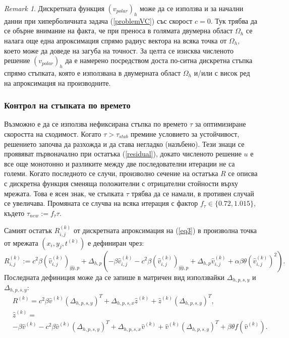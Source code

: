 \documentclass[a4paper]{article}
\newcommand{\rf}[1]{(\ref{#1})}
\theoremstyle{remark}
\newtheorem*{remark}{Remark}
\begin{document}
\begin{remark}
Дискретната функция $(v_{polar})_h$ може да се използва и за начални данни при хиперболичната задача \rf{problemVC} със скорост $c=0$. Тук трябва да се обърне внимание на факта, че при преноса в голямата двумерна област $\Omega_h$ се налага още една апроксимация спрямо радиус вектора на всяка точка от $\Omega_h$, което може да доведе на загуба на точност. За целта се изисква численото решение $(v_{polar})_h$ да е намерено посредством доста по-ситна дискретна стъпка спрямо стъпката, която е използвана в двумерната област $\Omega_h$ и/или с висок ред на апроксимация на производните.
\end{remark}

\subsubsection{Контрол на стъпката по времето}
Възможно е да се използва нефиксирана стъпка по времето $\tau$ за оптимизиране скоростта на сходимост. Когато $\tau > \tau_{stab}$ премине условието за устойчивост, решението започва да разхожда и да става негладко (назъбено). Тези знаци се проявяват първоначално при остатъка \rf{residual}, докато численото решение $u$ е все още монотонно и разликите между две последователни итерации не са големи. Когато последното се случи, произволно сечение на остатъка $R$ се описва с дискретна функция сменяща положителни с отрицателни стойности върху мрежата. Това е ясен знак, че стъпката $\tau$ трябва да се намали, в противен случай се увеличава. Промяната се случва на всяка итерация с фактор $f_{\tau} \in \{0.72, 1.015\}$, където $\tau_{new} := f_{\tau}\tau$.

Самият остатък $R^{(k)}_{i,j}$ от дискретната апроксимация на \rf{eq3} в произволна точка от мрежата $(x_i,y_j,t^{(k)})$ е дефиниран чрез:
\begin{equation}\label{residual}
R_{i,j}^{(k)} := 
c^2\beta (\widehat{v}^{(k)}_{i,j})_{\widehat{yy},p} + \Delta_{h,p}(-\beta \widehat{v}^{(k)}_{i,j} - c^2\beta (\widehat{v}^{(k)}_{i,j})_{\widehat{yy},p} + \Delta_{h,p} \widehat{v}^{(k)}_{i,j} 
+ \alpha \beta \theta (\widehat{v}^{(k)}_{i,j})^2  ).
\end{equation}
Последната дефиниция може да се запише в матричен вид използвайки $\Delta_{h,p,s,y}$ и $\Delta_{h,p,s,y}$:
\begin{align}\label{residualM}
&R^{(k)} = 
c^2\beta \widehat{v}^{(k)}(\Delta_{h,p,s,y})^T + \Delta_{h,p,s,x}  \widehat{z}^{(k)} + \widehat{z}^{(k)}  (\Delta_{h,p,s,y} )^T, \nonumber\\
&\widehat{z}^{(k)}  = \nonumber\\
&-\beta \widehat{v}^{(k)} - c^2\beta \widehat{v}^{(k)}(\Delta_{h,p,s,y})^T + \Delta_{h,p,s,x}  \widehat{v}^{(k)} +  \widehat{v}^{(k)}  (\Delta_{h,p,s,y})^T 
+ \beta \theta f(\widehat{v}^{(k)}).
\end{align}
 
\end{document}

